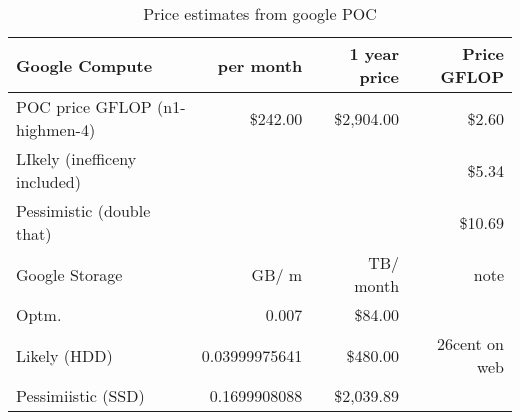 \tiny \begin{longtable} { |p{}  |r  |r  |r |} 
\caption{Price estimates from google POC \label{tab:Google}}\\ 
\hline 
{Google Compute}&{per month}&{1 year price}&{Price GFLOP} \\ \hline
{POC price GFLOP (n1-highmen-4)}&{\$242.00}&{\$2,904.00}&{\$2.60} \\ \hline
{LIkely (inefficeny included)}&{}&{}&{\$5.34} \\ \hline
{Pessimistic (double that)}&{}&{}&{\$10.69} \\ \hline
{Google Storage}&{GB/ m}&{TB/ month}&{note } \\ \hline
{Optm. }&{0.007}&{\$84.00}& \\ \hline
{Likely (HDD)}&{0.03999975641}&{\$480.00}&{26cent on web} \\ \hline
{Pessimiistic (SSD)}&{0.1699908088}&{\$2,039.89}& \\ \hline
\end{longtable} \normalsize
